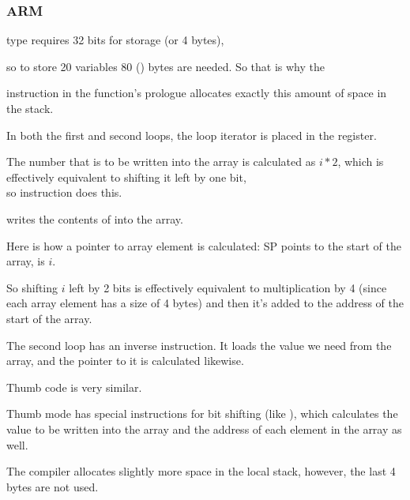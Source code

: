 \subsubsection{ARM}

\myparagraph{\NonOptimizingKeilVI (\ARMMode)}



\Tint type requires 32 bits for storage (or 4 bytes),

so to store 20 \Tint variables 80 () bytes are needed.
So that is why the  

instruction in the function's prologue allocates exactly this amount of space in the stack.

In both the first and second loops, the loop iterator  is placed in the  register.


The number that is to be written into the array is calculated as $i*2$, which is effectively equivalent 
to shifting it left by one bit,\\
so  instruction does this.

 writes the contents of  into the array.

Here is how a pointer to array element is calculated: \ac{SP} points to the start of the array,  is $i$.

So shifting $i$ left by 2 bits is effectively equivalent to multiplication by 4
(since each array element has a size of 4 bytes) and then it's added to the address of the start of the array.


The second loop has an inverse 
instruction. It loads the value we need from the array, and the pointer to it is calculated likewise.

\myparagraph{\OptimizingKeilVI (\ThumbMode)}



Thumb code is very similar.

Thumb mode has special instructions for bit shifting (like ),
which calculates the value to be written into the array and the address of each element in the array as well.

The compiler allocates slightly more space in the local stack, however, the last 4 bytes are not used.




